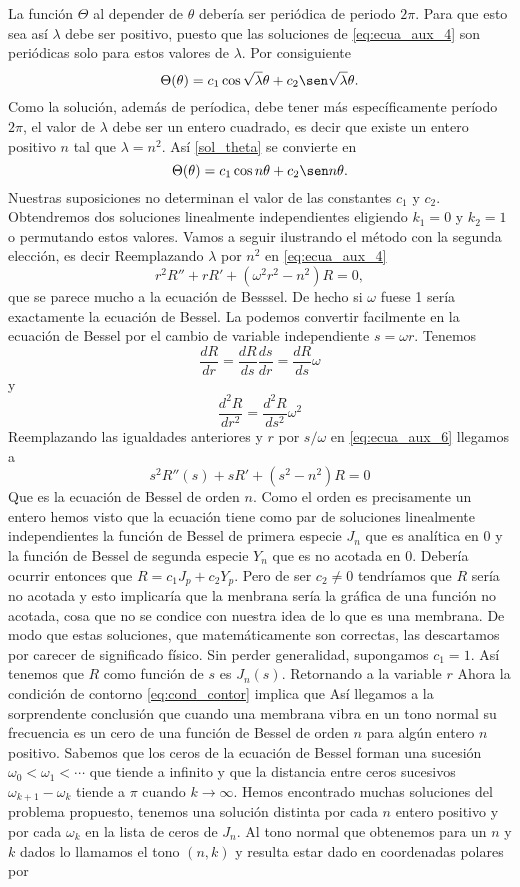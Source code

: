 La función $\Theta$ al depender de $\theta$ debería ser periódica de periodo $2\pi$. Para que esto sea así  $\lambda$ debe ser positivo, puesto que las soluciones de  \ref{eq:ecua_aux_4} son periódicas solo para estos valores de $\lambda$. Por consiguiente
\begin{equation}\label{sol_theta}
\Theta(\theta)=c_1\cos\sqrt{\lambda}\theta+c_2\sen\sqrt{\lambda}\theta.
\end{equation}
 Como la solución, además de períodica,  debe tener más específicamente  período $2\pi$, el valor de $\lambda$ debe ser un entero cuadrado, es decir que existe un entero positivo  $n$ tal que $\lambda=n^2$.   Así \eqref{sol_theta} se convierte en 
\[\Theta(\theta)= c_1\cos n\theta+c_2\sen n\theta.\]
Nuestras suposiciones no  determinan el valor de las constantes $c_1$ y $c_2$. Obtendremos dos soluciones linealmente independientes eligiendo $k_1=0$ y $k_2=1$ o permutando estos valores. Vamos a seguir ilustrando el método con la segunda elección, es decir
 Reemplazando $\lambda$ por $n^2$ en \eqref{eq:ecua_aux_4} 
\[r^2R'' +rR'+(\omega^2r^2-n^2) R=0\label{eq:ecua_aux_6},\]
que se parece mucho a la ecuación de Besssel. De hecho si $\omega$ fuese 1 sería exactamente la ecuación de Bessel. La podemos convertir facilmente en la ecuación de Bessel por el cambio de variable independiente $s=\omega r$. Tenemos 
\[\frac{dR}{dr}=\frac{dR}{ds}\frac{ds}{dr}=\frac{dR}{ds}\omega\]
y
\[\frac{d^2R}{dr^2}=\frac{d^2R}{ds^2}\omega^2\]
Reemplazando las igualdades anteriores y $r$ por $s/\omega$ en \eqref{eq:ecua_aux_6} llegamos a
\[s^2R''(s)+sR'+(s^2-n^2)R=0\]
Que es la ecuación de Bessel de orden $n$. Como el orden es precisamente un entero hemos visto que la ecuación tiene como par de soluciones linealmente independientes la función de Bessel de primera especie $J_n$ que es analítica en $0$ y la función de Bessel de segunda especie $Y_n$ que es no acotada en $0$. Debería ocurrir entonces que $R=c_1J_p+c_2Y_p$. Pero de ser $c_2\neq 0$ tendríamos que $R$ sería no acotada y esto implicaría que la menbrana sería la gráfica de una función no acotada, cosa que no se condice con nuestra idea de lo que es una membrana. De modo que estas soluciones, que matemáticamente son correctas, las descartamos por carecer de significado físico. Sin perder generalidad, supongamos $c_1=1$. Así tenemos que $R$ como función de $s$ es $J_n(s)$. Retornando a la variable $r$
Ahora la condición de contorno \eqref{eq:cond_contor} implica que
Así llegamos a la sorprendente conclusión que cuando una membrana vibra en un tono normal su frecuencia es un cero de una función de Bessel de orden $n$ para algún entero $n$ positivo. Sabemos que los ceros de la ecuación de Bessel forman una sucesión $\omega_0<\omega_1<\cdots$ que tiende a infinito y que la distancia entre ceros sucesivos $\omega_{k+1}-\omega_k$ tiende a $\pi$ cuando $k\to\infty$. Hemos encontrado muchas soluciones del problema propuesto, tenemos una solución distinta por cada $n$ entero positivo y por cada $\omega_k$ en la lista de ceros de $J_n$. Al tono normal que obtenemos para un $n$ y $k$ dados lo llamamos el tono $(n,k)$ y resulta estar dado en coordenadas polares por

